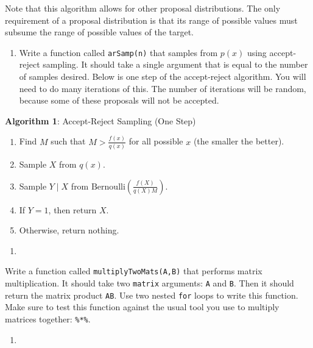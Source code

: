 \documentclass[12pt,krantz2]{krantz}
\providecommand{\tightlist}{%
  \setlength{\itemsep}{0pt}\setlength{\parskip}{0pt}}
\begin{document}
Note that this algorithm allows for other proposal distributions. The only requirement of a proposal distribution is that its range of possible values must subsume the range of possible values of the target.

\begin{enumerate}
\def\labelenumi{\alph{enumi})}
\tightlist
\item
  Write a function called \texttt{arSamp(n)} that samples from \(p(x)\) using accept-reject sampling. It should take a single argument that is equal to the number of samples desired. Below is one step of the accept-reject algorithm. You will need to do many iterations of this. The number of iterations will be random, because some of these proposals will not be accepted.
\end{enumerate}

\textbf{Algorithm 1}: Accept-Reject Sampling (One Step)

\begin{enumerate}
\def\labelenumi{\roman{enumi}.}
\tightlist
\item
  Find \(M\) such that \(M > \frac{f(x)}{q(x)}\) for all possible \(x\) (the smaller the better).
\item
  Sample \(X\) from \(q(x)\).
\item
  Sample \(Y \mid X\) from \(\text{Bernoulli}\left(\frac{f(X)}{q(X)M}\right)\).
\item
  If \(Y = 1\), then return \(X\).
\item
  Otherwise, return nothing.
\end{enumerate}

\begin{enumerate}
\def\labelenumi{\arabic{enumi}.}
\setcounter{enumi}{2}
\item
\end{enumerate}

Write a function called \texttt{multiplyTwoMats(A,B)} that performs matrix multiplication. It should take two \texttt{matrix} arguments: \texttt{A} and \texttt{B}. Then it should return the matrix product \texttt{AB}. Use two nested \texttt{for} loops to write this function. Make sure to test this function against the usual tool you use to multiply matrices together: \texttt{\%*\%}.

\begin{enumerate}
\def\labelenumi{\arabic{enumi}.}
\setcounter{enumi}{3}
\item
\end{enumerate}
\end{document}
